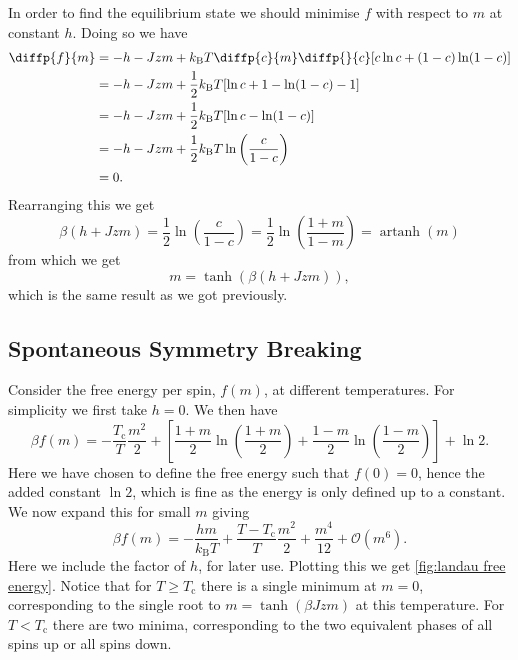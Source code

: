 \documentclass[fleqn]{NotesClass}
\newcommand*{\boltzmann}{k_{\mathrm{B}}}
\newcommand*{\order}{\mathcal{O}}
\DeclareMathOperator{\artanh}{artanh}
\begin{document}
    In order to find the equilibrium state we should minimise \(f\) with respect to \(m\) at constant \(h\).
    Doing so we have
    \begin{align}
        \diffp{f}{m} &= -h - Jzm + \boltzmann T \diffp{c}{m}\diffp{}{c}[c\ln c + (1 - c)\ln(1 - c)]\\
        &= -h - Jzm + \frac{1}{2}\boltzmann T[\ln c + 1 - \ln(1 - c) - 1]\\
        &= -h - Jzm + \frac{1}{2}\boltzmann T[\ln c - \ln(1 - c)]\\
        &= -h - Jzm + \frac{1}{2}\boltzmann T\ln\left( \frac{c}{1 - c} \right)\\
        &= 0.
    \end{align}
    Rearranging this we get
    \begin{equation}
        \beta(h + Jzm) = \frac{1}{2}\ln\left( \frac{c}{1 - c} \right) = \frac{1}{2}\ln\left( \frac{1 + m}{1 - m} \right) = \artanh(m)
    \end{equation}
    from which we get
    \begin{equation}
        m = \tanh(\beta(h + Jzm)),
    \end{equation}
    which is the same result as we got previously.
    
    \subsection{Spontaneous Symmetry Breaking}
    Consider the free energy per spin, \(f(m)\), at different temperatures.
    For simplicity we first take \(h = 0\).
    We then have
    \begin{equation}
        \beta f(m) = -\frac{T_{\mathrm{c}}}{T}\frac{m^2}{2} + \left[ \frac{1 + m}{2} \ln\left( \frac{1 + m}{2} \right) + \frac{1 - m}{2} \ln\left( \frac{1 - m}{2} \right) \right] + \ln 2.
    \end{equation}
    Here we have chosen to define the free energy such that \(f(0) = 0\), hence the added constant \(\ln 2\), which is fine as the energy is only defined up to a constant.
    We now expand this for small \(m\) giving
    \begin{equation}
        \beta f(m) = -\frac{hm}{\boltzmann T} + \frac{T - T_{\mathrm{c}}}{T} \frac{m^2}{2} + \frac{m^4}{12} + \order(m^6).
    \end{equation}
    Here we include the factor of \(h\), for later use.
    Plotting this we get \cref{fig:landau free energy}.
    Notice that for \(T \ge T_{\mathrm{c}}\) there is a single minimum at \(m = 0\), corresponding to the single root to \(m = \tanh(\beta Jzm)\) at this temperature.
    For \(T < T_{\mathrm{c}}\) there are two minima, corresponding to the two equivalent phases of all spins up or all spins down.
    
\end{document}
